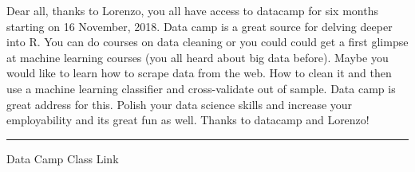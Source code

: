 \documentclass[]{article}
\theoremstyle{definition}
\theoremstyle{definition}
\theoremstyle{definition}
\theoremstyle{remark}
\begin{document}
Dear all, thanks to Lorenzo, you all have access to datacamp for six
months starting on 16 November, 2018. Data camp is a great source for
delving deeper into R. You can do courses on data cleaning or you could
could get a first glimpse at machine learning courses (you all heard
about big data before). Maybe you would like to learn how to scrape data
from the web. How to clean it and then use a machine learning classifier
and cross-validate out of sample. Data camp is great address for this.
Polish your data science skills and increase your employability and its
great fun as well. Thanks to datacamp and Lorenzo!

\begin{center}\rule{0.5\linewidth}{\linethickness}\end{center}

Data Camp Class Link
\end{document}
